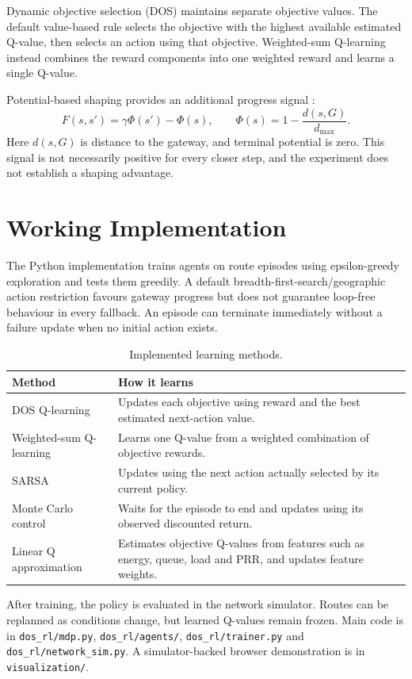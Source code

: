\documentclass[11pt,a4paper]{article}
\begin{document}
Dynamic objective selection (DOS) maintains separate objective values. The default value-based rule selects the objective with the highest available estimated Q-value, then selects an action using that objective. Weighted-sum Q-learning instead combines the reward components into one weighted reward and learns a single Q-value.

Potential-based shaping provides an additional progress signal \cite{ng}:
\begin{equation*}
F(s,s')=\gamma\Phi(s')-\Phi(s),\qquad
\Phi(s)=1-\frac{d(s,G)}{d_{\max}}.
\end{equation*}
Here $d(s,G)$ is distance to the gateway, and terminal potential is zero. This signal is not necessarily positive for every closer step, and the experiment does not establish a shaping advantage.

\section{Working Implementation}
The Python implementation trains agents on route episodes using epsilon-greedy exploration and tests them greedily. A default breadth-first-search/geographic action restriction favours gateway progress but does not guarantee loop-free behaviour in every fallback. An episode can terminate immediately without a failure update when no initial action exists.
\begin{table}[H]
\centering\small
\caption{Implemented learning methods.}
\begin{tabularx}{\linewidth}{@{}lY@{}}\toprule
\textbf{Method} & \textbf{How it learns}\\\midrule
DOS Q-learning & Updates each objective using reward and the best estimated next-action value.\\
Weighted-sum Q-learning & Learns one Q-value from a weighted combination of objective rewards.\\
SARSA & Updates using the next action actually selected by its current policy.\\
Monte Carlo control & Waits for the episode to end and updates using its observed discounted return.\\
Linear Q approximation & Estimates objective Q-values from features such as energy, queue, load and PRR, and updates feature weights.\\\bottomrule
\end{tabularx}
\end{table}
After training, the policy is evaluated in the network simulator. Routes can be replanned as conditions change, but learned Q-values remain frozen. Main code is in \texttt{dos\_rl/mdp.py}, \texttt{dos\_rl/agents/}, \texttt{dos\_rl/trainer.py} and \texttt{dos\_rl/network\_sim.py}. A simulator-backed browser demonstration is in \texttt{visualization/}.
\end{document}

